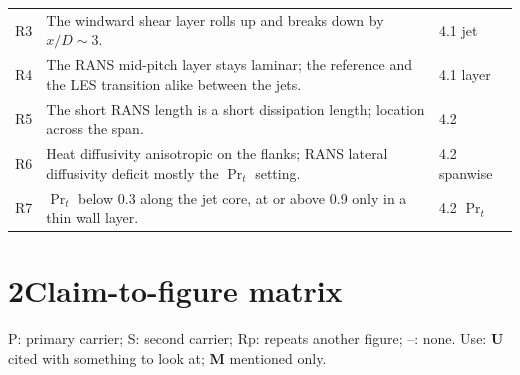 \documentclass[10pt]{article}
\begin{document}
{\begin{longtable}{@{}L{0.7cm} L{12.6cm} L{3.4cm}@{}}
R3 & The windward shear layer rolls up and breaks down by $x/D\sim3$. & 4.1 jet \\
R4 & The RANS mid-pitch layer stays laminar; the reference and the LES transition alike between the jets. & 4.1 layer \\
R5 & The short RANS length is a short dissipation length; location across the span. & 4.2 \\
R6 & Heat diffusivity anisotropic on the flanks; RANS lateral diffusivity deficit mostly the $\Pr_t$ setting. & 4.2 spanwise \\
R7 & $\Pr_t$ below 0.3 along the jet core, at or above 0.9 only in a thin wall layer. & 4.2 $\Pr_t$ \\
\bottomrule
\end{longtable}}

\section*{2\quad Claim-to-figure matrix}
P: primary carrier; S: second carrier; Rp: repeats another figure; --: none. Use: \textbf{U} cited with something
to look at; \textbf{M} mentioned only.
\end{document}
